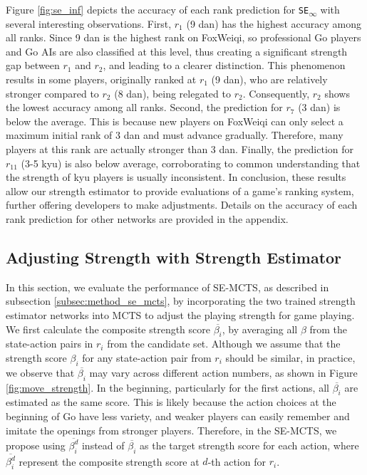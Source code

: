 Figure \ref{fig:se_inf} depicts the accuracy of each rank prediction for \texttt{SE\textsubscript{$\infty$}} with several interesting observations.
First, $r_1$ (9 dan) has the highest accuracy among all ranks.
Since 9 dan is the highest rank on FoxWeiqi, so professional Go players and Go AIs are also classified at this level, thus creating a significant strength gap between $r_1$ and $r_2$, and leading to a clearer distinction.
This phenomenon results in some players, originally ranked at $r_1$ (9 dan), who are relatively stronger compared to $r_2$ (8 dan), being relegated to $r_2$.
Consequently, $r_2$ shows the lowest accuracy among all ranks.
Second, the prediction for $r_7$ (3 dan) is below the average.
This is because new players on FoxWeiqi can only select a maximum initial rank of 3 dan and must advance gradually.
Therefore, many players at this rank are actually stronger than 3 dan.
Finally, the prediction for $r_{11}$ (3-5 kyu) is also below average, corroborating to common understanding that the strength of kyu players is usually inconsistent.
In conclusion, these results allow our strength estimator to provide evaluations of a game's ranking system, further offering developers to make adjustments.
Details on the accuracy of each rank prediction for other networks are provided in the appendix.


\subsection{Adjusting Strength with Strength Estimator}
\label{subsec:exp_se_mcts}
In this section, we evaluate the performance of SE-MCTS, as described in subsection \ref{subsec:method_se_mcts}, by incorporating the two trained strength estimator networks into MCTS to adjust the playing strength for game playing.
We first calculate the composite strength score $\overline{\beta_i}$, by averaging all $\beta$ from the state-action pairs in $r_i$ from the candidate set.
Although we assume that the strength score $\beta_i$ for any state-action pair from $r_i$ should be similar, in practice, we observe that $\overline{\beta_i}$ may vary across different action numbers, as shown in Figure \ref{fig:move_strength}.
In the beginning, particularly for the first actions, all $\overline{\beta_i}$ are estimated as the same score.
This is likely because the action choices at the beginning of Go have less variety, and weaker players can easily remember and imitate the openings from stronger players.
Therefore, in the SE-MCTS, we propose using $\overline{\beta_i^d}$ instead of $\overline{\beta_i}$ as the target strength score for each action, where $\overline{\beta_i^d}$ represent the composite strength score at $d$-th action for $r_i$.


